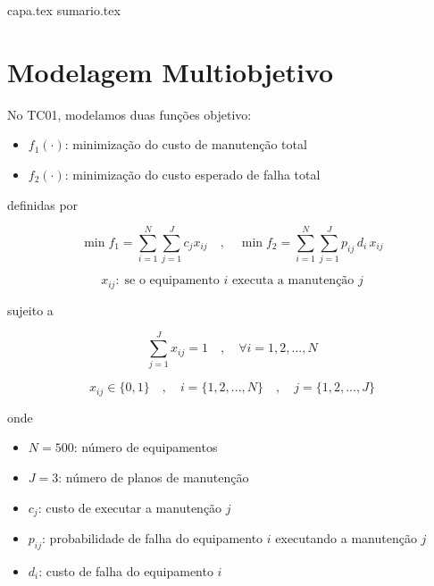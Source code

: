 \documentclass[
	12pt,				%
	oneside,			%
	a4paper,			%
	chapter=TITLE,
	sumario=tradicional,
	english,			%
	brazil				%
]{abntex2}
\newcommand{\un}[1]{\;\text{#1}}
\begin{document}

\frenchspacing 

{capa.tex}
{sumario.tex}

\textual

\pagestyle{simple}

\chapter{Modelagem Multiobjetivo}\label{cap:modelagem} 

No TC01, modelamos duas funções objetivo:

\begin{itemize}
	\item $f_1 (\cdot)$: minimização do custo de manutenção total 
	\item $f_2 (\cdot)$: minimização do custo esperado de falha total
\end{itemize}

\noindent definidas por 

\[  
\min f_1 = \sum_{i=1}^{N} \sum_{j=1}^{J} c_j x_{ij} \quad , \quad 
\min f_2 = \sum_{i=1}^{N} \sum_{j=1}^{J} p_{ij} \, d_i \, x_{ij}
\]

\[  x_{ij}: \un{se o equipamento $i$ executa a manutenção $j$}  \]

\noindent sujeito a

\[ \sum_{j=1}^{J} x_{ij} = 1 \quad , \quad \forall i = {1, 2, ..., N} \]

\[ x_{ij} \in \{0,1\} \quad , \quad i = \{1, 2, ..., N\}  \quad , \quad j = \{1, 2, ..., J\} \]

\noindent onde

\begin{itemize}
	\item $N = 500$: número de equipamentos
	\item $J = 3$: número de planos de manutenção
	\item $c_j$: custo de executar a manutenção $j$
	\item $p_{ij}$: probabilidade de falha do equipamento $i$ executando a manutenção $j$
	\item $d_{i}$: custo de falha do equipamento $i$
\end{itemize}
\end{document}
